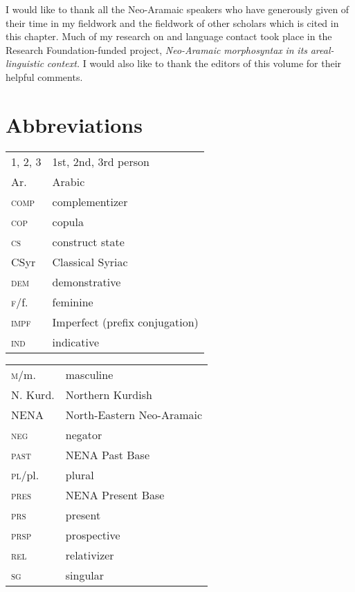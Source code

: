 \documentclass[output=paper]{langsci/langscibook}
\begin{document}
I would like to thank all the Neo-Aramaic speakers who have generously given of their time in my fieldwork and the fieldwork of other scholars which is cited in this chapter. Much of my research on  and language contact took place in the  Research Foundation-funded project, \textit{Neo-Aramaic} \textit{morphosyntax} \textit{in} \textit{its} \textit{areal-linguistic} \textit{context.} I would also like to thank the editors of this volume for their helpful comments.


\section*{Abbreviations}

\begin{tabularx}{.5\textwidth}{@{}lQ@{}}
\textsc{1, 2, 3} & 1st, 2nd, 3rd person \\
Ar.            & Arabic\\
\textsc{comp}    & {complementizer}\\
\textsc{cop}     & {copula}\\
\textsc{cs}     & construct state\\
CSyr          & Classical Syriac\\
\textsc{dem}     & demonstrative \\
\textsc{f}/f.    & feminine\\
\textsc{impf}   & Imperfect (prefix conjugation)\\
\textsc{ind}     & indicative\\
\end{tabularx}%
\begin{tabularx}{.5\textwidth}{@{}lQ@{}}
\textsc{m}/m.    & masculine\\
N. Kurd.        & Northern Kurdish \\ 
NENA            & North-Eastern Neo-Aramaic\\
\textsc{neg}    & negator\\
\textsc{past}   & {NENA} Past Base\\
\textsc{pl}/pl.  & plural\\
\textsc{pres}    & {NENA} Present Base \\
\textsc{prs}    & present \\
\textsc{prsp}    & {prospective} \\
\textsc{rel}     & {relativizer}\\
\textsc{sg}  & singular
\end{tabularx}%
\end{document}
